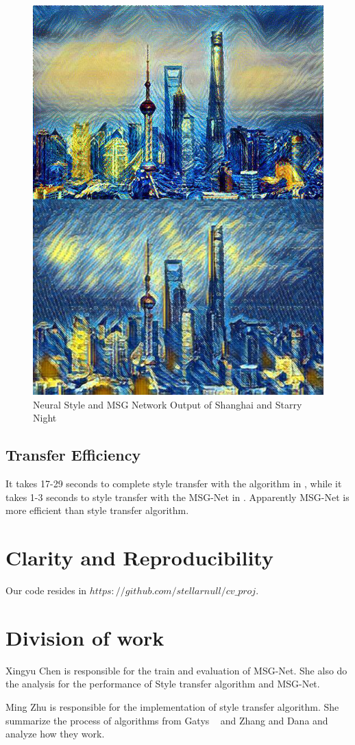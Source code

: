 \documentclass[10pt,twocolumn,letterpaper]{article}
\begin{document}
\begin{figure}[t]
\begin{center}
\includegraphics[width=0.6\linewidth]{images/shn_cmp.jpg}
\end{center}
\caption{Neural Style and MSG Network Output of Shanghai and Starry Night}
\label{fig:long}
\label{fig:onecol}
\label{fig_shn_cmp}
\end{figure}

\subsection{Transfer Efficiency}
It takes 17-29 seconds to complete style transfer with the algorithm in \cite{Authors01}, while it takes 1-3 seconds to style transfer with the MSG-Net in \cite{Authors04}. Apparently MSG-Net is more efficient than style transfer algorithm. 



\section{Clarity and Reproducibility}
Our code resides in \newline $https://github.com/stellarnull/cv\_proj$.


\section{Division of work}
Xingyu Chen is responsible for the train and evaluation of MSG-Net. She also do the analysis for the performance of Style transfer algorithm and MSG-Net.

Ming Zhu is responsible for the implementation of style transfer algorithm. She summarize the process of algorithms from Gatys \etal~\cite{Authors01} and Zhang and Dana \cite{Authors04} and analyze how they work.

{\small


}
\end{document}
